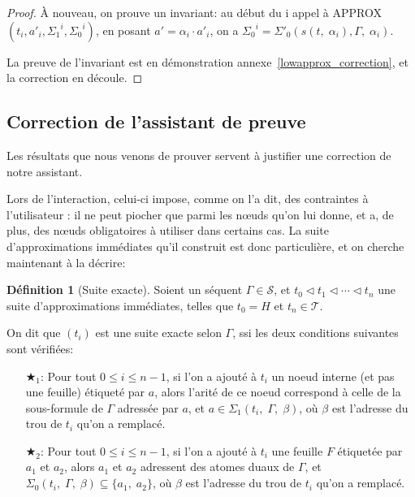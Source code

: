 \documentclass[11pt,a4paper]{article}
\theoremstyle{plain}
\theoremstyle{definition}
\newtheorem{definition}{Définition}
\theoremstyle{remark}
\newcommand*{\sequent}{\Gamma}
\newcommand*{\sequents}{\ensuremath{\mathcal{S}}}
\newcommand*{\trees}{\ensuremath{\mathcal{T}}}
\newcommand*{\relapprox}{\ensuremath{\triangleleft}}
\newcommand*{\unknown}{H}
\newcommand*{\lowapprox}{\ensuremath{\Sigma_0}}
\newcommand*{\lowapproxspec}{\ensuremath{\Sigma'_0}}
\newcommand*{\highapprox}{\ensuremath{\Sigma_1}}
\newcommand*{\treesimplify}{\ensuremath{s}}
\newcommand*{\exactcond}{\bigstar_1}
\newcommand*{\exactcondbis}{\bigstar_2}
\begin{document}
\begin{proof}
    À nouveau, on prouve un invariant: au début du i\ieme{} appel à APPROX$(t_i, a'_i, {\highapprox}^i, {\lowapprox}^i)$, en posant $a' = {\alpha}_i \cdot a'_i$, on a ${\lowapprox}^i = \lowapproxspec \left( \treesimplify( t, \; {\alpha}_i ), \sequent, \; {\alpha}_i \right)$.

    La preuve de l'invariant est en démonstration annexe~\ref{lowapprox_correction}, et la correction en découle.
\end{proof}

\subsection{Correction de l'assistant de preuve}
\label{correction_section}

Les résultats que nous venons de prouver servent à justifier une correction de notre assistant.

Lors de l'interaction, celui-ci impose, comme on l'a dit, des contraintes à l'utilisateur : il ne peut piocher que parmi les n\oe uds qu'on lui donne, et a, de plus, des n\oe uds obligatoires à utiliser dans certains cas. La suite d'approximations immédiates qu'il construit est donc particulière, et on cherche maintenant à la décrire:


\begin{definition}[Suite exacte]
    Soient un séquent $\sequent \in \sequents$, et $t_0 \relapprox t_1 \relapprox \cdots \relapprox t_n$ une suite d'approximations immédiates, telles que $t_0 = \unknown$ et $t_n \in \trees$.

    On dit que $(t_i)$ est une suite exacte selon $\sequent$, ssi les deux conditions suivantes sont vérifiées:
    \begin{enumerate}
        \item[$\exactcond$:]
        Pour tout $0 \leq i \leq n-1$, si l'on a ajouté à $t_i$ un noeud interne (et pas une feuille) étiqueté par $a$, alors l'arité de ce noeud correspond à celle de la sous-formule de $\sequent$ adressée par $a$, et $a \in \highapprox(t_i, \; \sequent, \; \beta)$, où $\beta$ est l'adresse du trou de $t_i$ qu'on a remplacé.

        \item[$\exactcondbis$:]
        Pour tout $0 \leq i \leq n-1$, si l'on a ajouté à $t_i$ une feuille $F$ étiquetée par $a_1$ et $a_2$, alors $a_1$ et $a_2$ adressent des atomes duaux de $\sequent$, et $\lowapprox(t_i, \; \sequent, \; \beta) \subseteq \{a_1, \; a_2\}$, où $\beta$ est l'adresse du trou de $t_i$ qu'on a remplacé.
    \end{enumerate}
\end{definition}
\end{document}
